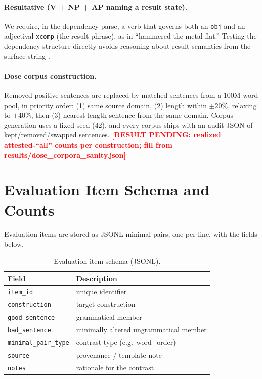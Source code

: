 \documentclass[11pt]{article}
\newcommand{\resultpending}[1]{%
  \textcolor{red}{\textbf{[RESULT PENDING: #1]}}}
\begin{document}
\paragraph{Resultative (V + NP + AP naming a result state).}
We require, in the dependency parse, a verb that governs both an \texttt{obj}
and an adjectival \texttt{xcomp} (the result phrase), as in ``hammered the
metal flat.'' Testing the dependency structure directly avoids reasoning
about result semantics from the surface string
\citep{goldberg2004resultatives}.

\paragraph{Dose corpus construction.}
Removed positive sentences are replaced by matched sentences from a
100M-word pool, in priority order: (1) same source domain, (2) length
within $\pm 20\%$, relaxing to $\pm 40\%$, then (3) nearest-length
sentence from the same domain. Corpus generation uses a fixed seed (42),
and every corpus ships with an audit JSON of kept/removed/swapped
sentences. \resultpending{realized attested-``all'' counts per construction;
fill from results/dose\_corpora\_sanity.json}

\section{Evaluation Item Schema and Counts}
\label{app:items}
Evaluation items are stored as JSONL minimal pairs, one per line, with the
fields below.

\begin{table}[h]
  \centering
  \small
  \begin{tabular}{ll}
    \toprule
    Field & Description \\
    \midrule
    \texttt{item\_id}          & unique identifier \\
    \texttt{construction}      & target construction \\
    \texttt{good\_sentence}    & grammatical member \\
    \texttt{bad\_sentence}     & minimally altered ungrammatical member \\
    \texttt{minimal\_pair\_type} & contrast type (e.g.\ word\_order) \\
    \texttt{source}            & provenance / template note \\
    \texttt{notes}             & rationale for the contrast \\
    \bottomrule
  \end{tabular}
  \caption{Evaluation item schema (JSONL).}
  \label{tab:item-schema}
\end{table}
\end{document}
